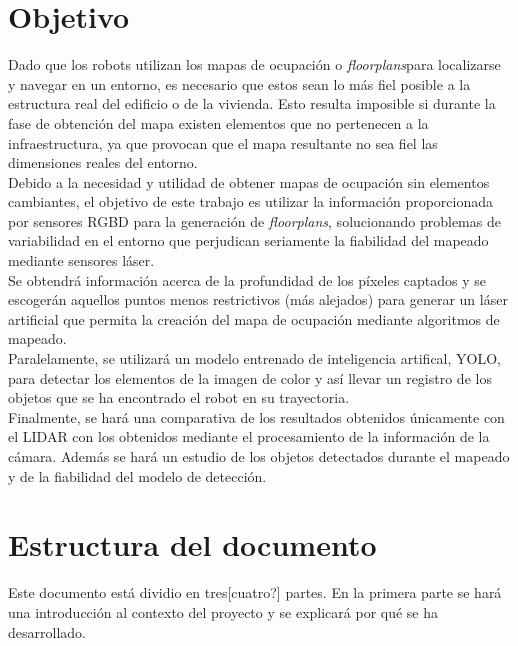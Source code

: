 \section{Objetivo}

Dado que los robots utilizan los mapas de ocupación o \textit{floorplans}para localizarse y navegar en un entorno, es necesario que estos sean lo más fiel posible a la estructura real del edificio o de la vivienda. Esto resulta imposible si durante la fase de obtención del mapa existen elementos que no pertenecen a la infraestructura, ya que provocan que el mapa resultante no sea fiel las dimensiones reales del entorno.\\

Debido a la necesidad y utilidad de obtener mapas de ocupación sin elementos cambiantes, el objetivo de este trabajo es utilizar la información proporcionada por sensores RGBD para la generación de \textit{floorplans}, solucionando problemas de variabilidad en el entorno que perjudican seriamente la fiabilidad del mapeado mediante sensores láser.\\

Se obtendrá información acerca de la profundidad de los píxeles captados y se escogerán aquellos puntos menos restrictivos (más alejados) para generar un láser artificial que permita la creación del mapa de ocupación mediante algoritmos de mapeado.\\

Paralelamente, se utilizará un modelo entrenado de inteligencia artifical, YOLO, para detectar los elementos de la imagen de color y así llevar un registro de los objetos que se ha encontrado el robot en su trayectoria.\\

Finalmente, se hará una comparativa de los resultados obtenidos únicamente con el LIDAR con los obtenidos mediante el procesamiento de la información de la cámara. Además se hará un estudio de los objetos detectados durante el mapeado y de la fiabilidad del modelo de detección. \\

\section{Estructura del documento}

Este documento está dividio en tres[cuatro?] partes. En la primera parte se hará una introducción al contexto del proyecto y se explicará por qué se ha desarrollado.\\

